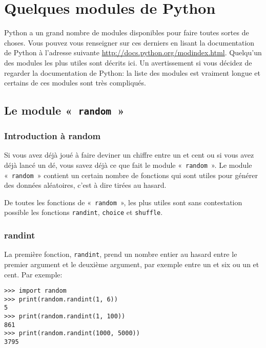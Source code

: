 

\chapter{Quelques modules de Python}\label{app:modules}

Python a un grand nombre de modules disponibles pour faire toutes sortes de choses. Vous pouvez vous renseigner sur ces derniers en lisant la documentation de Python à l'adresse suivante \url{http://docs.python.org/modindex.html}. Quelqu'un des modules les plus utiles sont décrits ici. Un avertissement si vous décidez de regarder la documentation de Python: la liste des modules est vraiment longue et certains de ces modules sont très compliqués.

\section{Le module «~\texttt{random}~»}
\subsection{Introduction à random}
Si vous avez déjà joué à faire deviner un chiffre entre un et cent ou si vous avez déjà lancé un dé, vous savez déjà ce que fait le module «~\texttt{random}~». Le module «~\texttt{random}~» contient un certain nombre de fonctions qui sont utiles pour générer des données aléatoires, c'est à dire tirées au hasard.

De toutes les fonctions de «~\texttt{random}~», les plus utiles sont sans contestation possible les fonctions \verb+randint+, \verb+choice+ et \verb+shuffle+. 

\subsection{randint}
La première fonction, \verb+randint+, prend un nombre entier au hasard entre le premier argument et le deuxième argument, par exemple entre un et six ou un et cent. Par exemple:

\begin{Verbatim}[frame=single,rulecolor=\color{gray}]
>>> import random
>>> print(random.randint(1, 6))
5
>>> print(random.randint(1, 100))
861
>>> print(random.randint(1000, 5000))
3795
\end{Verbatim}

